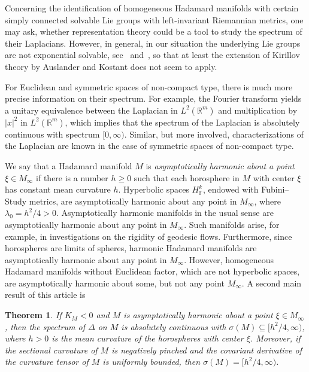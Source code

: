 \documentclass[10pt,a4paper]{amsart}
\numberwithin{equation}{section}
\newtheorem{Theorem}{Theorem}[section]
\def\F{\mathbb F}
\def\R{\mathbb R}
\begin{document}
Concerning the identification of homogeneous Hadamard manifolds
with certain simply connected solvable Lie groups with left-invariant Riemannian metrics,
one may ask, whether representation theory could be a tool to study the spectrum of their Laplacians.
However, in general, in our situation the underlying Lie groups are not exponential solvable,
see~\cite[p.~26 and p.~37]{AzencottWilsonI76} and~\cite[Remark (ii) on p.~16]{AzencottWilsonII76},
so that at least the extension of Kirillov theory by Auslander and Kostant does not seem to apply.

For Euclidean and symmetric spaces of non-compact type,
there is much more precise information on their spectrum.
For example, the Fourier transform yields a unitary equivalence between the Laplacian in $L^2(\R^m)$
and multiplication by $|x|^2$ in $L^2(\R^m)$,
which implies that the spectrum of the Laplacian is absolutely continuous with spectrum $[0,\infty)$.
Similar, but more involved, characterizations of the Laplacian are known
in the case of symmetric spaces of non-compact type.

We say that a Hadamard manifold $M$ is \emph{asymptotically harmonic about a point $\xi\in M_\infty$}
if there is a number $h\ge0$ such that each horosphere in $M$ with center $\xi$ has constant mean curvature $h$.
Hyperbolic spaces $H^k_{\F}$, endowed with Fubini--Study metrics, are asymptotically harmonic about any point in $M_\infty$, where $\lambda_0=h^2/4>0$.
Asymptotically harmonic manifolds in the usual sense are asymptotically harmonic about any point in $M_\infty$.
Such manifolds arise, for example, in investigations on the rigidity of geodesic flows.
Furthermore, since horospheres are limits of spheres,
harmonic Hadamard manifolds are asymptotically harmonic about any point in $M_\infty$.
However, homogeneous Hadamard manifolds without Euclidean factor,
which are not hyperbolic spaces, are asymptotically harmonic about some, but not any point $M_\infty$.
A second main result of this article is

\begin{Theorem}\label{onlyacm}
If $K_M<0$ and $M$ is asymptotically harmonic about a point $\xi\in M_\infty$,
then the spectrum of $\Delta$ on $M$ is absolutely continuous with $\sigma(M)\subseteq\bigl[h^2/4,\infty\bigr)$,
where $h>0$ is the mean curvature of the horospheres with center $\xi$.
Moreover, if the sectional curvature of $M$ is negatively pinched and the covariant derivative of the curvature tensor of $M$ is uniformly bounded, then $\sigma(M)=\bigl[h^2/4,\infty\bigr)$.
\end{Theorem}
\end{document}
